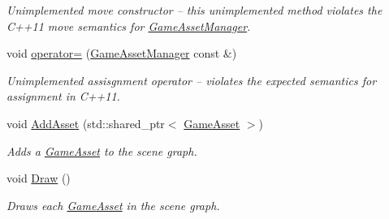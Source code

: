 \begin{DoxyCompactItemize}
\begin{DoxyCompactList}\small\item\em Unimplemented move constructor -- this unimplemented method violates the C++11 move semantics for \hyperlink{classGameAssetManager}{Game\+Asset\+Manager}. \end{DoxyCompactList}\item 
void \hyperlink{classGameAssetManager_ac72678a4ad5378c685aa6bae84a4e712}{operator=} (\hyperlink{classGameAssetManager}{Game\+Asset\+Manager} const \&)
\begin{DoxyCompactList}\small\item\em Unimplemented assisgnment operator -- violates the expected semantics for assignment in C++11. \end{DoxyCompactList}\item 
void \hyperlink{classGameAssetManager_ad3de8ff00d55ba04728b1de8213b2349}{Add\+Asset} (std\+::shared\+\_\+ptr$<$ \hyperlink{classGameAsset}{Game\+Asset} $>$)
\begin{DoxyCompactList}\small\item\em Adds a \hyperlink{classGameAsset}{Game\+Asset} to the scene graph. \end{DoxyCompactList}\item 
void \hyperlink{classGameAssetManager_a32837132bd70a9a9ed537323c2d3d886}{Draw} ()
\begin{DoxyCompactList}\small\item\em Draws each \hyperlink{classGameAsset}{Game\+Asset} in the scene graph. \end{DoxyCompactList}\end{DoxyCompactItemize}
